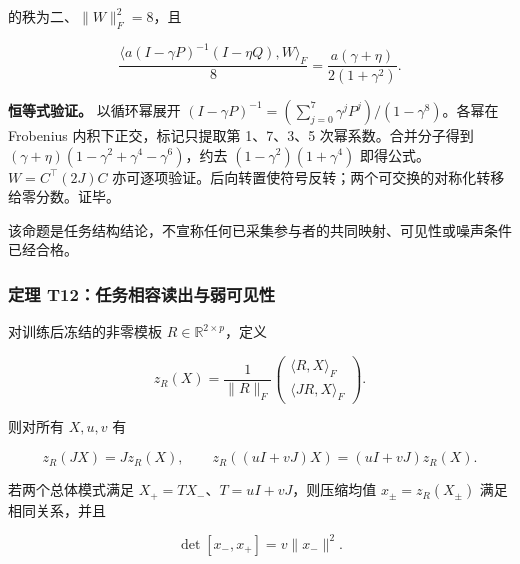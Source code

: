 \documentclass[11pt,a4paper]{article}
\begin{document}
\par
\noindent\begin{minipage}{\linewidth}

的秩为二、\(\|W\|_F^2=8\)，且

\[
\frac{\langle a(I-\gamma P)^{-1}(I-\eta Q),W\rangle_F}{8}
=\frac{a(\gamma+\eta)}{2(1+\gamma^2)}.
\]

\end{minipage}\par

\textbf{恒等式验证。} 以循环幂展开
\((I-\gamma P)^{-1}=(\sum_{j=0}^7\gamma^jP^j)/(1-\gamma^8)\)。各幂在
Frobenius 内积下正交，标记只提取第 1、7、3、5 次幂系数。合并分子得到
\((\gamma+\eta)(1-\gamma^2+\gamma^4-\gamma^6)\)，约去
\((1-\gamma^2)(1+\gamma^4)\) 即得公式。\(W=C^\top(2J)C\)
亦可逐项验证。后向转置使符号反转；两个可交换的对称化转移给零分数。证毕。

该命题是任务结构结论，不宣称任何已采集参与者的共同映射、可见性或噪声条件已经合格。

\subsubsection{定理
T12：任务相容读出与弱可见性}\label{ux5b9aux7406-t12ux4efbux52a1ux76f8ux5bb9ux8bfbux51faux4e0eux5f31ux53efux89c1ux6027}

\par
\noindent\begin{minipage}{\linewidth}

对训练后冻结的非零模板 \(R\in\mathbb R^{2\times p}\)，定义

\[
z_R(X)=\frac1{\|R\|_F}
\begin{pmatrix}\langle R,X\rangle_F\\
\langle JR,X\rangle_F\end{pmatrix}.
\]

\end{minipage}\par

\par
\noindent\begin{minipage}{\linewidth}

则对所有 \(X,u,v\) 有

\[
z_R(JX)=Jz_R(X),\qquad
z_R((uI+vJ)X)=(uI+vJ)z_R(X).
\]

\end{minipage}\par

\par
\noindent\begin{minipage}{\linewidth}

若两个总体模式满足 \(X_+=T X_-\)、\(T=uI+vJ\)，则压缩均值
\(x_\pm=z_R(X_\pm)\) 满足相同关系，并且

\[
\det[x_-,x_+]=v\|x_-\|^2.
\]

\end{minipage}\par
\end{document}

